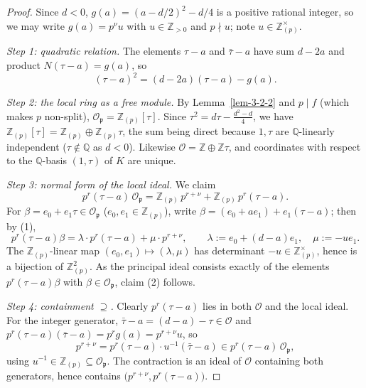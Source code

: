 \begin{proof}
  Since $d < 0$, $g(a) = (a - d/2)^2 - d/4$ is a positive rational integer,
  so we may write $g(a) = p^{\nu} u$ with $u \in \mathbb{Z}_{>0}$ and
  $p \nmid u$; note $u \in \mathbb{Z}_{(p)}^{\times}$.

  \emph{Step 1: quadratic relation.} The elements $\tau - a$ and
  $\bar{\tau} - a$ have sum $d - 2a$ and product $N(\tau - a) = g(a)$, so
  \begin{equation}
    (\tau - a)^2 = (d - 2a)(\tau - a) - g(a). \tag{1}
  \end{equation}

  \emph{Step 2: the local ring as a free module.} By
  Lemma~\ref{lem-3-2-2} and $p \mid f$ (which makes $p$ non-split),
  $\mathcal{O}_{\mathfrak{p}} = \mathbb{Z}_{(p)}[\tau]$. Since
  $\tau^2 = d\tau - \frac{d^2 - d}{4}$, we have
  $\mathbb{Z}_{(p)}[\tau] = \mathbb{Z}_{(p)} \oplus \mathbb{Z}_{(p)}\tau$,
  the sum being direct because $1, \tau$ are $\mathbb{Q}$-linearly
  independent ($\tau \notin \mathbb{Q}$ as $d < 0$). Likewise
  $\mathcal{O} = \mathbb{Z} \oplus \mathbb{Z}\tau$, and coordinates with
  respect to the $\mathbb{Q}$-basis $(1, \tau)$ of $K$ are unique.

  \emph{Step 3: normal form of the local ideal.} We claim
  \begin{equation}
    p^r(\tau - a)\,\mathcal{O}_{\mathfrak{p}}
      = \mathbb{Z}_{(p)}\, p^{r+\nu} + \mathbb{Z}_{(p)}\, p^r(\tau - a).
      \tag{2}
  \end{equation}
  For $\beta = e_0 + e_1\tau \in \mathcal{O}_{\mathfrak{p}}$
  ($e_0, e_1 \in \mathbb{Z}_{(p)}$), write
  $\beta = (e_0 + a e_1) + e_1(\tau - a)$; then by (1),
  \begin{equation}
    p^r(\tau - a)\beta
      = \lambda \cdot p^r(\tau - a) + \mu \cdot p^{r+\nu},
    \qquad
    \lambda := e_0 + (d - a)e_1, \quad \mu := -u e_1 . \tag{3}
  \end{equation}
  The $\mathbb{Z}_{(p)}$-linear map $(e_0, e_1) \mapsto (\lambda, \mu)$ has
  determinant $-u \in \mathbb{Z}_{(p)}^{\times}$, hence is a bijection of
  $\mathbb{Z}_{(p)}^2$. As the principal ideal consists exactly of the
  elements $p^r(\tau - a)\beta$ with $\beta \in \mathcal{O}_{\mathfrak{p}}$,
  claim (2) follows.

  \emph{Step 4: containment $\supseteq$.} Clearly
  $p^r(\tau - a)$ lies in both $\mathcal{O}$ and the local ideal. For the
  integer generator, $\bar{\tau} - a = (d - a) - \tau \in \mathcal{O}$ and
  $p^r(\tau - a)(\bar{\tau} - a) = p^r g(a) = p^{r+\nu} u$, so
  \[
    p^{r+\nu}
      = p^r(\tau - a) \cdot u^{-1}(\bar{\tau} - a)
      \in p^r(\tau - a)\,\mathcal{O}_{\mathfrak{p}},
  \]
  using $u^{-1} \in \mathbb{Z}_{(p)} \subseteq \mathcal{O}_{\mathfrak{p}}$.
  The contraction is an ideal of $\mathcal{O}$ containing both generators,
  hence contains $\bigl(p^{r+\nu}, p^r(\tau - a)\bigr)$.


\end{proof}
